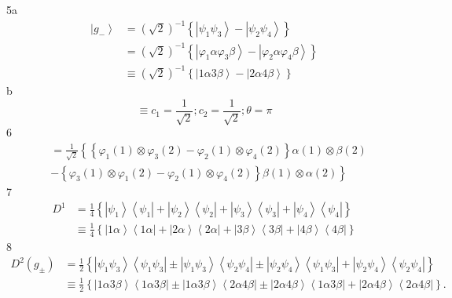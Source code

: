\documentclass[aps,preprint]{revtex4}%
\begin{document}
5a%
\begin{align*}
\left\vert g_{-}\right\rangle  &  =\left(  \sqrt{2}\right)  ^{-1}\left\{
\left\vert \psi_{1}\psi_{3}\right\rangle -\left\vert \psi_{2}\psi
_{4}\right\rangle \right\} \\
&  =\left(  \sqrt{2}\right)  ^{-1}\left\{  \left\vert \varphi_{1}\alpha
\varphi_{3}\beta\right\rangle -\left\vert \varphi_{2}\alpha\varphi_{4}%
\beta\right\rangle \right\} \\
&  \equiv\left(  \sqrt{2}\right)  ^{-1}\left\{  \left\vert 1\alpha
3\beta\right\rangle -\left\vert 2\alpha4\beta\right\rangle \right\}
\end{align*}
b%
\[
\equiv c_{1}=\frac{1}{\sqrt{2}};c_{2}=\frac{1}{\sqrt{2}};\theta=\pi
\]
6%
\begin{align*}
&  =\frac{1}{\sqrt{2}}\left\{  \left\{  \varphi_{1}\left(  1\right)
\otimes\varphi_{3}\left(  2\right)  -\varphi_{2}\left(  1\right)
\otimes\varphi_{4}\left(  2\right)  \right\}  \alpha\left(  1\right)
\otimes\beta\left(  2\right)  \right. \\
&  \left.  -\left\{  \varphi_{3}\left(  1\right)  \otimes\varphi_{1}\left(
2\right)  -\varphi_{2}\left(  1\right)  \otimes\varphi_{4}\left(  2\right)
\right\}  \beta\left(  1\right)  \otimes\alpha\left(  2\right)  \right\}
\end{align*}
7%
\begin{align*}
D^{1}  &  =\frac{1}{4}\left\{  \left\vert \psi_{1}\right\rangle \left\langle
\psi_{1}\right\vert +\left\vert \psi_{2}\right\rangle \left\langle \psi
_{2}\right\vert +\left\vert \psi_{3}\right\rangle \left\langle \psi
_{3}\right\vert +\left\vert \psi_{4}\right\rangle \left\langle \psi
_{4}\right\vert \right\} \\
&  \equiv\frac{1}{4}\left\{  \left\vert 1\alpha\right\rangle \left\langle
1\alpha\right\vert +\left\vert 2\alpha\right\rangle \left\langle
2\alpha\right\vert +\left\vert 3\beta\right\rangle \left\langle 3\beta
\right\vert +\left\vert 4\beta\right\rangle \left\langle 4\beta\right\vert
\right\}
\end{align*}
8%
\begin{align*}
D^{2}\left(  g_{\pm}\right)   &  =\frac{1}{2}\left\{  \left\vert \psi_{1}%
\psi_{3}\right\rangle \left\langle \psi_{1}\psi_{3}\right\vert \pm\left\vert
\psi_{1}\psi_{3}\right\rangle \left\langle \psi_{2}\psi_{4}\right\vert
\pm\left\vert \psi_{2}\psi_{4}\right\rangle \left\langle \psi_{1}\psi
_{3}\right\vert +\left\vert \psi_{2}\psi_{4}\right\rangle \left\langle
\psi_{2}\psi_{4}\right\vert \right\} \\
&  \equiv\frac{1}{2}\left\{  \left\vert 1\alpha3\beta\right\rangle
\left\langle 1\alpha3\beta\right\vert \pm\left\vert 1\alpha3\beta\right\rangle
\left\langle 2\alpha4\beta\right\vert \pm\left\vert 2\alpha4\beta\right\rangle
\left\langle 1\alpha3\beta\right\vert +\left\vert 2\alpha4\beta\right\rangle
\left\langle 2\alpha4\beta\right\vert \right\}  .
\end{align*}
\end{document}
